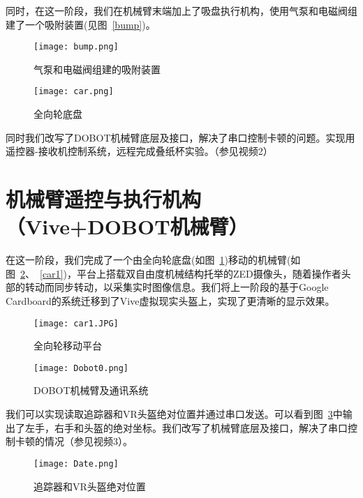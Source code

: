 同时，在这一阶段，我们在机械臂末端加上了吸盘执行机构，使用气泵和电磁阀组建了一个吸附装置(见图~\ref{bump})。

\begin{figure}
\begin{minipage}{0.48\textwidth}
  \centering
  \texttt{[image: bump.png]}
  \caption{气泵和电磁阀组建的吸附装置}
  \label{bump}
\end{minipage}
\begin{minipage}{0.48\textwidth}
  \centering
  \texttt{[image: car.png]}
  \caption{全向轮底盘}
  \label{car}
\end{minipage}\hfill
\end{figure}


同时我们改写了DOBOT机械臂底层及接口，解决了串口控制卡顿的问题。实现用遥控器-接收机控制系统，远程完成叠纸杯实验。{\kaishu （参见视频2）}

\section{机械臂遥控与执行机构（Vive+DOBOT机械臂）}

在这一阶段，我们完成了一个由全向轮底盘(如图~\ref{car})移动的机械臂(如图~\ref{sys}、~\ref{car1})，平台上搭载双自由度机械结构托举的ZED摄像头，随着操作者头部的转动而同步转动，以采集实时图像信息。我们将上一阶段的基于Google Cardboard的系统迁移到了Vive虚拟现实头盔上，实现了更清晰的显示效果。

\begin{figure}
\begin{minipage}{0.48\textwidth}
  \centering
  \texttt{[image: car1.JPG]}
  \caption{全向轮移动平台}
  \label{car1}
\end{minipage}
\begin{minipage}{0.48\textwidth}
  \centering
\texttt{[image: Dobot0.png]}
\caption{DOBOT机械臂及通讯系统} 
\label{sys}
\end{minipage}\hfill
\end{figure}


我们可以实现读取追踪器和VR头盔绝对位置并通过串口发送。可以看到图~\ref{POS}中输出了左手，右手和头盔的绝对坐标。我们改写了机械臂底层及接口，解决了串口控制卡顿的情况{\kaishu （参见视频3）}。

\begin{figure}[htbp]
\small
\centering
\texttt{[image: Date.png]}
\caption{追踪器和VR头盔绝对位置} 
\label{POS}
\end{figure}

